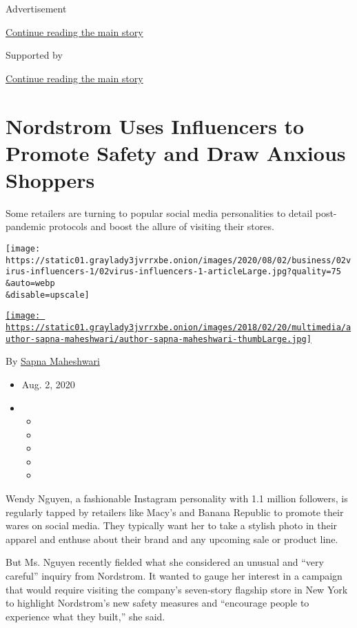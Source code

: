 Advertisement

\protect\hyperlink{after-top}{Continue reading the main story}

Supported by

\protect\hyperlink{after-sponsor}{Continue reading the main story}

\hypertarget{nordstrom-uses-influencers-to-promote-safety-and-draw-anxious-shoppers}{%
\section{Nordstrom Uses Influencers to Promote Safety and Draw Anxious
Shoppers}\label{nordstrom-uses-influencers-to-promote-safety-and-draw-anxious-shoppers}}

Some retailers are turning to popular social media personalities to
detail post-pandemic protocols and boost the allure of visiting their
stores.

\texttt{[image: https://static01.graylady3jvrrxbe.onion/images/2020/08/02/business/02virus-influencers-1/02virus-influencers-1-articleLarge.jpg?quality=75\\\&auto=webp\\\&disable=upscale]}

\href{https://www.nytimes3xbfgragh.onion/by/sapna-maheshwari}{\texttt{[image: https://static01.graylady3jvrrxbe.onion/images/2018/02/20/multimedia/author-sapna-maheshwari/author-sapna-maheshwari-thumbLarge.jpg]}}

By \href{https://www.nytimes3xbfgragh.onion/by/sapna-maheshwari}{Sapna
Maheshwari}

\begin{itemize}
\item
  Aug. 2, 2020
\item
  \begin{itemize}
  \item
  \item
  \item
  \item
  \item
  \end{itemize}
\end{itemize}

Wendy Nguyen, a fashionable Instagram personality with 1.1 million
followers, is regularly tapped by retailers like Macy's and Banana
Republic to promote their wares on social media. They typically want her
to take a stylish photo in their apparel and enthuse about their brand
and any upcoming sale or product line.

But Ms. Nguyen recently fielded what she considered an unusual and
``very careful'' inquiry from Nordstrom. It wanted to gauge her interest
in a campaign that would require visiting the company's seven-story
flagship store in New York to highlight Nordstrom's new safety measures
and ``encourage people to experience what they built,'' she said.


